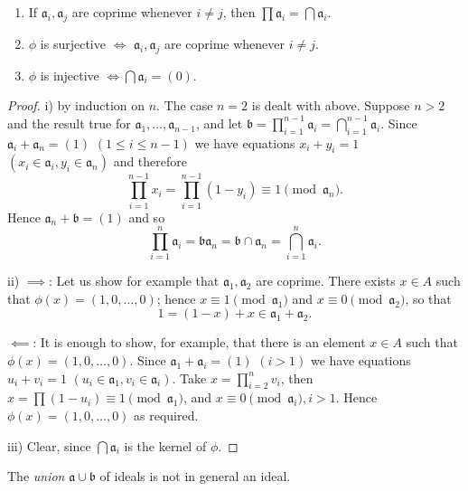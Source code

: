 \begin{proposition}\label{pro:chinese-remainder}
\begin{enumerate}
    \item[i)] If $\mathfrak{a}_i, \mathfrak{a}_j$ are coprime whenever $i \neq j$, then $\prod \mathfrak{a}_i = \bigcap \mathfrak{a}_i$.
    \item[ii)] $\phi$ is surjective $\iff$ $\mathfrak{a}_i, \mathfrak{a}_j$ are coprime whenever $i \neq j$.
    \item[iii)] $\phi$ is injective $\iff \bigcap \mathfrak{a}_i = (0)$.
\end{enumerate}
\end{proposition}

\begin{proof}
i) by induction on $n$. The case $n = 2$ is dealt with above. Suppose $n > 2$ and the result true for $\mathfrak{a}_1, \ldots, \mathfrak{a}_{n-1}$, and let $\mathfrak{b} = \prod_{i=1}^{n-1} \mathfrak{a}_i = \bigcap_{i=1}^{n-1} \mathfrak{a}_i$. Since $\mathfrak{a}_i + \mathfrak{a}_n = (1)$ $(1 \le i \le n-1)$ we have equations $x_i + y_i = 1$ $(x_i \in \mathfrak{a}_i, y_i \in \mathfrak{a}_n)$ and therefore
\[
\prod_{i=1}^{n-1} x_i = \prod_{i=1}^{n-1} (1 - y_i) \equiv 1 \pmod{\mathfrak{a}_n}.
\]
Hence $\mathfrak{a}_n + \mathfrak{b} = (1)$ and so
\[
\prod_{i=1}^{n} \mathfrak{a}_i = \mathfrak{b}\mathfrak{a}_n = \mathfrak{b} \cap \mathfrak{a}_n = \bigcap_{i=1}^{n} \mathfrak{a}_i.
\]

ii) $\implies$: Let us show for example that $\mathfrak{a}_1, \mathfrak{a}_2$ are coprime. There exists $x \in A$ such that $\phi(x) = (1, 0, \ldots, 0)$; hence $x \equiv 1 \pmod{\mathfrak{a}_1}$ and $x \equiv 0 \pmod{\mathfrak{a}_2}$, so that
\[
1 = (1 - x) + x \in \mathfrak{a}_1 + \mathfrak{a}_2.
\]

$\impliedby$: It is enough to show, for example, that there is an element $x \in A$ such that $\phi(x) = (1, 0, \ldots, 0)$. Since $\mathfrak{a}_1 + \mathfrak{a}_i = (1)$ $(i > 1)$ we have equations $u_i + v_i = 1$ $(u_i \in \mathfrak{a}_1, v_i \in \mathfrak{a}_i)$. Take $x = \prod_{i=2}^{n} v_i$, then $x = \prod (1 - u_i) \equiv 1 \pmod{\mathfrak{a}_1}$, and $x \equiv 0 \pmod{\mathfrak{a}_i}, i > 1$. Hence $\phi(x) = (1, 0, \ldots, 0)$ as required.

iii) Clear, since $\bigcap \mathfrak{a}_i$ is the kernel of $\phi$.
\end{proof}

The \emph{union} $\mathfrak{a} \cup \mathfrak{b}$ of ideals is not in general an ideal.

